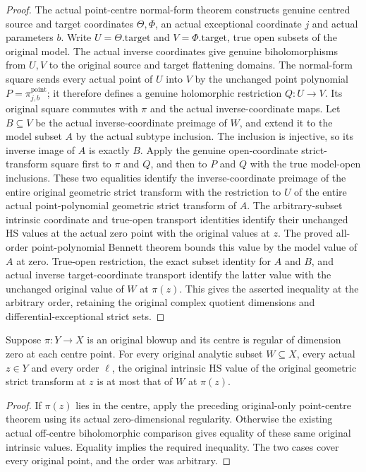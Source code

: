 \begin{proof}
The actual point-centre normal-form theorem constructs genuine centred
source and target coordinates $\Theta,\Phi$, an actual exceptional
coordinate $j$ and actual parameters $b$. Write $U=\Theta.\mathrm{target}$
and $V=\Phi.\mathrm{target}$, true open subsets of the original model.
The actual inverse coordinates give genuine biholomorphisms from $U,V$
to the original source and target flattening domains. The normal-form
square sends every actual point of $U$ into $V$ by the unchanged point
polynomial $P=\pi^{\mathrm{point}}_{j,b}$; it therefore defines a genuine
holomorphic restriction $Q:U\to V$. Its original square commutes with
$\pi$ and the actual inverse-coordinate maps.
Let $B\subseteq V$ be the actual inverse-coordinate preimage of $W$,
and extend it to the model subset $A$ by the actual subtype inclusion.
The inclusion is injective, so its inverse image of $A$ is exactly $B$.
Apply the genuine open-coordinate strict-transform square first to
$\pi$ and $Q$, and then to $P$ and $Q$ with the true model-open inclusions.
These two equalities identify the inverse-coordinate preimage of the
entire original geometric strict transform with the restriction to $U$
of the entire actual point-polynomial geometric strict transform of $A$.
The arbitrary-subset intrinsic coordinate and true-open transport
identities identify their unchanged HS values at the actual zero point
with the original values at $z$. The proved all-order point-polynomial
Bennett theorem bounds this value by the model value of $A$ at zero.
True-open restriction, the exact subset identity for $A$ and $B$, and
actual inverse target-coordinate transport identify the latter value
with the unchanged original value of $W$ at $\pi(z)$. This gives the
asserted inequality at the arbitrary order, retaining the original
complex quotient dimensions and differential-exceptional strict sets.
\end{proof}

\begin{theorem}
\label{hir:actual-zero-dimensional-centre-bennett-all-points-all-orders}
\leanok
Suppose $\pi:Y\to X$ is an original blowup and its centre is regular of
dimension zero at each centre point. For every original analytic subset
$W\subseteq X$, every actual $z\in Y$ and every order $\ell$, the original
intrinsic HS value of the original geometric strict transform at $z$
is at most that of $W$ at $\pi(z)$.
\end{theorem}
\begin{proof}
If $\pi(z)$ lies in the centre, apply the preceding original-only
point-centre theorem using its actual zero-dimensional regularity.
Otherwise the existing actual off-centre biholomorphic comparison gives
equality of these same original intrinsic values. Equality implies the
required inequality. The two cases cover every original point, and the
order was arbitrary.
\end{proof}

